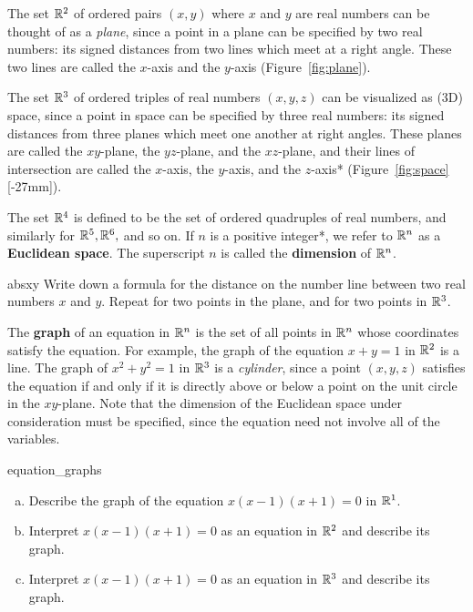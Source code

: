 \documentclass[prettycode,shellescape]{watsonbook}
\begin{document}
The set $\mathbb{R}^2$ of ordered pairs $(x,y)$ where $x$ and $y$ are real
numbers can be thought of as a \textit{plane}, since a point in a
plane can be specified by two real numbers: its signed distances from
two lines which meet at a right angle. These two lines are called the
$x$-axis and the $y$-axis (Figure~\ref{fig:plane}). 

The set $\mathbb{R}^3$ of ordered triples of real numbers $(x,y,z)$ can be
visualized as (3D) space, since a point in space can be specified by
three real numbers: its signed distances from three planes which meet
one another at right angles. These planes are called the $xy$-plane,
the $yz$-plane, and the $xz$-plane, and their lines of intersection
are called the $x$-axis, the $y$-axis, and the $z$-axis*
(Figure~\ref{fig:space}[-27mm]).

The set $\mathbb{R}^4$ is defined to be the set of ordered quadruples of real
numbers, and similarly for $\mathbb{R}^5, \mathbb{R}^6,$ and so on.  
 If
$n$ is a positive integer*, we refer to $\mathbb{R}^n$ as a \textbf{Euclidean
  space}. The superscript $n$
is called the \textbf{dimension} of $\mathbb{R}^n$.

\begin{exercise}[parbox=true]{}{absxy}
  Write down a formula for the distance on the number line between two 
  real numbers $x$ and $y$. Repeat for two points in the plane, and
  for two points in $\mathbb{R}^3$. 
\end{exercise}

\bang{4mm}
The \textbf{graph} of an equation in $\mathbb{R}^n$ is the set of all points
in $\mathbb{R}^n$ whose coordinates satisfy the equation. For example, the
graph of the equation $x + y = 1$ in $\mathbb{R}^2$ is a line. The graph of
$x^2 + y^2 = 1$ in $\mathbb{R}^3$ is a \textit{cylinder}, since a point
$(x,y,z)$ satisfies the equation if and only if it is directly above
or below a point on the unit circle in the $xy$-plane. Note that the
dimension of the Euclidean space under consideration must be
specified, since the equation need not involve all of the variables.

\begin{exercise}{}{equation_graphs}
  \begin{enumerate}[(a), leftmargin = 12pt, itemsep = 4pt]
  \item Describe the graph of the equation $x(x-1)(x+1) = 0$ in
    $\mathbb{R}^1$. 
  \item Interpret $x(x-1)(x+1) = 0$ as an equation in $\mathbb{R}^2$ and
    describe its graph. 
  \item Interpret $x(x-1)(x+1) = 0$ as an equation in $\mathbb{R}^3$ and
    describe its graph.
  \end{enumerate}
\end{exercise}
\end{document}
